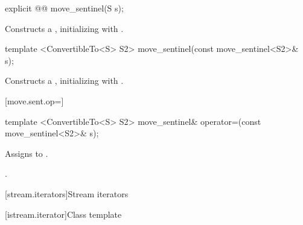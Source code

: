 %
\begin{itemdecl}
explicit @@ move_sentinel(S s);
\end{itemdecl}

\begin{itemdescr}
\pnum
\effects Constructs a , initializing
 with .
\end{itemdescr}

%
\begin{itemdecl}
template <ConvertibleTo<S> S2>
  move_sentinel(const move_sentinel<S2>& s);
\end{itemdecl}

\begin{itemdescr}
\pnum
\effects Constructs a , initializing
 with .
\end{itemdescr}

[move.sent.op=]{}

%
%
\begin{itemdecl}
template <ConvertibleTo<S> S2>
  move_sentinel& operator=(const move_sentinel<S2>& s);
\end{itemdecl}

\begin{itemdescr}
\pnum
\effects Assigns  to .

\pnum
\returns {}.
\end{itemdescr}







[stream.iterators]{Stream iterators}

[istream.iterator]{Class template }


